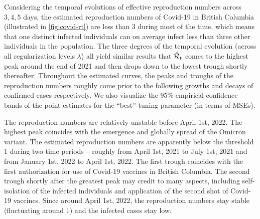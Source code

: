 Considering the temporal evolutions of effective reproduction numbers across $3, 4, 5$ days, the estimated reproduction numbers of Covid-19 in British Columbia (illustrated in \autoref{fig:covid-rt}) are less than $3$ during most of the time, which means that one distinct infected individuals can on average infect less than three other individuals in the population. The three degrees of the temporal evolution (across all regularization levels $\lambda$) all yield similar results that $\hat{\mathcal{R}}_t$ comes to the highest peak around the end of 2021 and then drops down to the lowest trough shortly thereafter. Throughout the estimated curves, the peaks and troughs of the reproduction numbers roughly come prior to the following growths and decays of confirmed cases respectively.
We also visualize the 95\% empirical confidence bands of the point estimates for the ``best'' tuning parameter (in terms of MSEs). 

The reproduction numbers are relatively unstable before April 1st, 2022. The highest peak coincides with the emergence and globally spread of the Omicron variant. The estimated reproduction numbers are apparently below the threshold $1$ during two time periods -- roughly from April 1st, 2021 to July 1st, 2021 and from January 1st, 2022 to April 1st, 2022. The first trough coincides with the first authorization for use of Covid-19 vaccines in British Columbia. The second trough shortly after the greatest peak may credit to many aspects, including self-isolation of the infected individuals and application of the second shot of Covid-19 vaccines. Since around April 1st, 2022, the reproduction numbers stay stable (fluctuating around $1$) and the infected cases stay low. 

